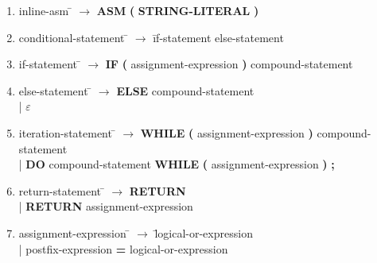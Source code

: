 \begin{enumerate}
\item \begin{tabbing} inline-asm \= $\rightarrow$ \= \textbf{ASM} \textbf{(} \textbf{STRING-LITERAL} \textbf{)} \end{tabbing}

\item \begin{tabbing} conditional-statement \= $\rightarrow$ \= if-statement else-statement \end{tabbing}

\item \begin{tabbing} if-statement \= $\rightarrow$ \= \textbf{IF} \textbf{(} assignment-expression \textbf{)} compound-statement \end{tabbing}

\item \begin{tabbing} else-statement \= $\rightarrow$ \= \textbf{ELSE} compound-statement \\
	\> \hspace*{0.05cm} | \> $\varepsilon$ \\
\end{tabbing}

\item \begin{tabbing} iteration-statement \= $\rightarrow$ \= \textbf{WHILE} \textbf{(} assignment-expression \textbf{)} compound-statement \\
	\> \hspace*{0.05cm} | \> \textbf{DO} compound-statement \textbf{WHILE} \textbf{(} assignment-expression \textbf{)} \textbf{;} \\
\end{tabbing}

\item \begin{tabbing} return-statement \= $\rightarrow$ \= \textbf{RETURN} \\
	\> \hspace*{0.05cm} | \> \textbf{RETURN} assignment-expression \\
\end{tabbing}

\item \begin{tabbing} assignment-expression \= $\rightarrow$ \= logical-or-expression \\
	\> \hspace*{0.05cm} | \> postfix-expression \textbf{=} logical-or-expression \\
\end{tabbing}


\end{enumerate}
